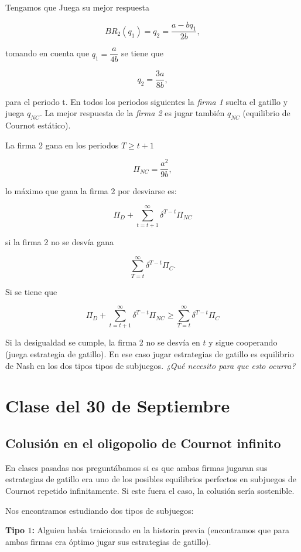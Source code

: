 \documentclass[letterpaper,12pt,twocolumn]{report}
\begin{document}
Tengamos que Juega su mejor respuesta

$$ BR_2(q_1)=q_2=\dfrac{a-bq_1}{2b},$$

tomando en cuenta que $q_1=\dfrac{a}{4b}$ se tiene que 

$$ q_2=\dfrac{3a}{8b},$$

para el periodo t. En todos los periodos siguientes la \textit{firma 1} suelta el gatillo y juega $q_{NC}$. La mejor respuesta de la \textit{firma 2} es jugar también $q_{NC}$ (equilibrio de Cournot estático).

La firma 2 gana en los periodos $T\geq t+1$ 

$$ \Pi_{NC}= \dfrac{a^2}{9b},$$

lo máximo que gana la firma 2 por desviarse es:

$$ \Pi_D + \sum_{t=t+1}^{\infty}\delta^{T-t}\Pi_{NC} $$

si la firma 2 no se desvía gana

$$\sum_{T=t}^{\infty}\delta^{T-t}\Pi_C .$$

Si se tiene que

$$ \Pi_D + \sum_{t=t+1}^{\infty}\delta^{T-t}\Pi_{NC} \geq \sum_{T=t}^{\infty}\delta^{T-t}\Pi_C $$

Si la desigualdad se cumple, la firma 2 no se desvía en $t$ y sigue cooperando (juega estrategia de gatillo). En ese caso jugar estrategias de gatillo es equilibrio de Nash en los dos tipos tipos de subjuegos. \textit{¿Qué necesito para que esto ocurra?}

\section{Clase del 30 de Septiembre}

\subsection*{Colusión en el oligopolio de Cournot infinito}

En clases pasadas nos preguntábamos si es que ambas firmas jugaran sus estrategias de gatillo era uno de los posibles equilibrios perfectos en subjuegos de Cournot repetido infinitamente. Si este fuera el caso, la colusión sería sostenible.

Nos encontramos estudiando dos tipos de subjuegos:

\textbf{Tipo $1$:} Alguien había traicionado en la historia previa (encontramos que para ambas firmas era óptimo jugar sus estrategias de gatillo).
\end{document}
